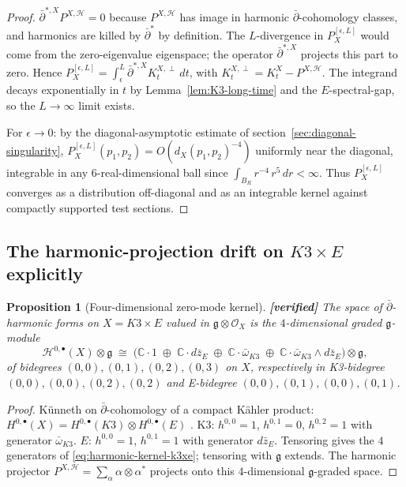 \documentclass[11pt]{amsart}
\providecommand{\ClaimStatusVerified}{\textbf{[verified]}}
\providecommand{\dbar}{\bar\partial}
\providecommand{\C}{\mathbb{C}}
\providecommand{\frakg}{\mathfrak{g}}
\newtheorem{proposition}[theorem]{Proposition}
\theoremstyle{definition}
\theoremstyle{remark}
\begin{document}
\begin{proof}
$\dbar^{*,X} P^{X,\mathcal H} = 0$ because
$P^{X,\mathcal H}$ has image in harmonic $\dbar$-cohomology
classes, and harmonics are killed by $\dbar^*$ by definition.
The $L$-divergence in $P_X^{[\epsilon,L]}$ would come from the
zero-eigenvalue eigenspace; the operator $\dbar^{*,X}$ projects
this part to zero. Hence
$P_X^{[\epsilon,L]} = \int_\epsilon^L \dbar^{*,X} K^{X,\perp}_t\,dt$,
with $K^{X,\perp}_t = K^X_t - P^{X,\mathcal H}$. The integrand
decays exponentially in $t$ by Lemma~\ref{lem:K3-long-time} and
the $E$-spectral-gap, so the $L \to \infty$ limit exists.

For $\epsilon \to 0$: by the diagonal-asymptotic estimate of
section~\ref{sec:diagonal-singularity},
$P_X^{[\epsilon,L]}(p_1,p_2) = O(d_X(p_1,p_2)^{-4})$ uniformly
near the diagonal, integrable in any $6$-real-dimensional ball
since $\int_{B_R} r^{-4}\,r^5\,dr < \infty$. Thus
$P_X^{[\epsilon,L]}$ converges as a distribution off-diagonal
and as an integrable kernel against compactly supported test
sections.
\end{proof}

\subsection{The harmonic-projection drift on $K3 \times E$ explicitly}

\begin{proposition}[Four-dimensional zero-mode kernel]
\label{prop:zero-mode-kernel}
\ClaimStatusVerified
The space of $\dbar$-harmonic forms on $X = K3 \times E$ valued in
$\frakg \otimes \mathcal{O}_X$ is the $4$-dimensional graded
$\frakg$-module
\begin{equation}
  \label{eq:harmonic-kernel-k3xe}
  \mathcal H^{0,\bullet}(X) \otimes \frakg
  \;\cong\;
  \bigl(
    \C \cdot 1
    \;\oplus\;
    \C \cdot d\bar z_E
    \;\oplus\;
    \C \cdot \bar\omega_{K3}
    \;\oplus\;
    \C \cdot \bar\omega_{K3} \wedge d\bar z_E
  \bigr) \otimes \frakg,
\end{equation}
of bidegrees $(0,0), (0,1), (0,2), (0,3)$ on $X$,
respectively in K3-bidegree $(0,0),(0,0),(0,2),(0,2)$ and E-bidegree
$(0,0),(0,1),(0,0),(0,1)$.
\end{proposition}

\begin{proof}
K\"unneth on $\dbar$-cohomology of a compact K\"ahler product:
$H^{0,\bullet}(X) = H^{0,\bullet}(K3) \otimes H^{0,\bullet}(E)$
\cite[K\"unneth]{Demailly}. K3: $h^{0,0} = 1$, $h^{0,1} = 0$,
$h^{0,2} = 1$ with generator $\bar\omega_{K3}$. $E$: $h^{0,0} = 1$,
$h^{0,1} = 1$ with generator $d\bar z_E$. Tensoring gives the
$4$ generators of \eqref{eq:harmonic-kernel-k3xe}; tensoring with
$\frakg$ extends. The harmonic projector
$P^{X,\mathcal H} = \sum_\alpha \alpha \otimes \alpha^*$
projects onto this $4$-dimensional $\frakg$-graded space.
\end{proof}
\end{document}
